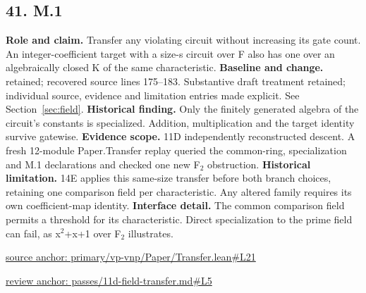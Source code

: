 \documentclass[11pt,letterpaper]{article}
\theoremstyle{definition}\newtheorem{definition}[theorem]{Definition}\newtheorem{example}[theorem]{Example}
\theoremstyle{remark}\newtheorem{remark}[theorem]{Remark}
\begin{document}
\subsection*{41. M.1}
\textbf{Role and claim.} Transfer any violating circuit without increasing its gate count. An integer-coefficient target with a size-s circuit over F also has one over an algebraically closed K of the same characteristic.
\textbf{Baseline and change.} retained; recovered source lines 175--183. Substantive draft treatment retained; individual source, evidence and limitation entries made explicit. See Section~\ref{sec:field}.
\textbf{Historical finding.} Only the finitely generated algebra of the circuit's constants is specialized. Addition, multiplication and the target identity survive gatewise.
\textbf{Evidence scope.} 11D independently reconstructed descent. A fresh 12-module Paper.Transfer replay queried the common-ring, specialization and M.1 declarations and checked one new F\ensuremath{{}_2} obstruction.
\textbf{Historical limitation.} 14E applies this same-size transfer before both branch choices, retaining one comparison field per characteristic. Any altered family requires its own coefficient-map identity.
\textbf{Interface detail.} The common comparison field permits a threshold for its characteristic. Direct specialization to the prime field can fail, as x\ensuremath{{}^2}+x+1 over F\ensuremath{{}_2} illustrates.
\par\href{https://github.com/nousentllc/VP-VNP-Review/blob/8a7976933b6b2b4ffda1ad3a0dfb5fc6b6f023e8/primary/vp-vnp/Paper/Transfer.lean\#L21}{source anchor: primary/vp-vnp/Paper/Transfer.lean\#L21}
\par\href{https://github.com/nousentllc/VP-VNP-Review/blob/8a7976933b6b2b4ffda1ad3a0dfb5fc6b6f023e8/passes/11d-field-transfer.md\#L5}{review anchor: passes/11d-field-transfer.md\#L5}
\goodbreak
\end{document}
